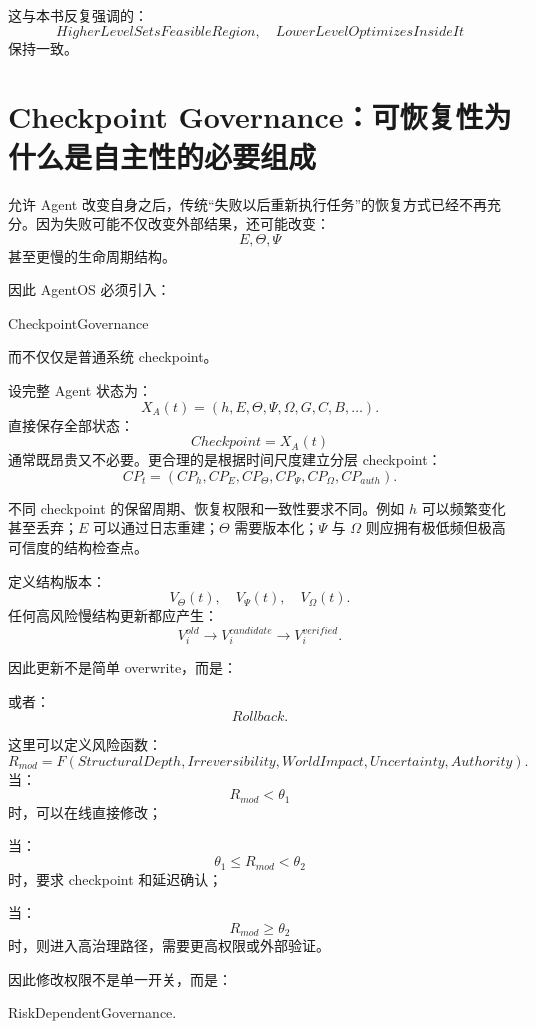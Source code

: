这与本书反复强调的：
\[
HigherLevelSetsFeasibleRegion,
\quad
LowerLevelOptimizesInsideIt
\]
保持一致。

\section{Checkpoint Governance：可恢复性为什么是自主性的必要组成}

允许 Agent 改变自身之后，传统“失败以后重新执行任务”的恢复方式已经不再充分。因为失败可能不仅改变外部结果，还可能改变：
\[
E,\Theta,\Psi
\]
甚至更慢的生命周期结构。

因此 AgentOS 必须引入：
\begin{statementbox}
CheckpointGovernance
\end{statementbox}
而不仅仅是普通系统 checkpoint。

设完整 Agent 状态为：
\[
X_A(t)
=
(h,E,\Theta,\Psi,\Omega,G,C,B,\ldots).
\]
直接保存全部状态：
\[
Checkpoint=X_A(t)
\]
通常既昂贵又不必要。更合理的是根据时间尺度建立分层 checkpoint：
\[
CP_t
=
(
CP_h,
CP_E,
CP_\Theta,
CP_\Psi,
CP_\Omega,
CP_{auth}
).
\]

不同 checkpoint 的保留周期、恢复权限和一致性要求不同。例如 $h$ 可以频繁变化甚至丢弃；$E$ 可以通过日志重建；$\Theta$ 需要版本化；$\Psi$ 与 $\Omega$ 则应拥有极低频但极高可信度的结构检查点。

定义结构版本：
\[
V_\Theta(t),
\quad
V_\Psi(t),
\quad
V_\Omega(t).
\]
任何高风险慢结构更新都应产生：
\[
V_i^{old}
\rightarrow
V_i^{candidate}
\rightarrow
V_i^{verified}.
\]

因此更新不是简单 overwrite，而是：
\begin{statementbox}
\centering
{}
\end{statementbox}
或者：
\[
Rollback.
\]

这里可以定义风险函数：
\[
R_{mod}
=
F(
StructuralDepth,
Irreversibility,
WorldImpact,
Uncertainty,
Authority
).
\]
当：
\[
R_{mod}<\theta_1
\]
时，可以在线直接修改；

当：
\[
\theta_1
\le
R_{mod}
<
\theta_2
\]
时，要求 checkpoint 和延迟确认；

当：
\[
R_{mod}\ge\theta_2
\]
时，则进入高治理路径，需要更高权限或外部验证。

因此修改权限不是单一开关，而是：
\begin{statementbox}
RiskDependentGovernance.
\end{statementbox}


